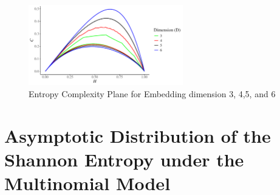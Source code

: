 
\begin{figure}[H]
	\centering
	\includegraphics[width=0.6\textwidth]{complexity plane}
	\caption{Entropy Complexity Plane for Embedding dimension 3, 4,5, and 6}
	\label{fig:complexity}
\end{figure}

\section {Asymptotic Distribution of the Shannon Entropy under the Multinomial Model} \label{Sec:AsymptoticDistribution}

